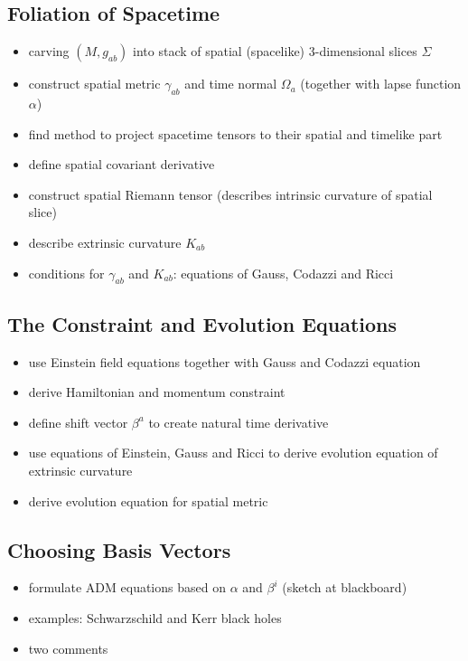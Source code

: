 \documentclass[twocolumn]{article}
\begin{document}
    \subsection{Foliation of Spacetime} %
    \label{sub:foliation_of_spacetime}
      \begin{itemize}
        \item carving $(M,g_{ab})$ into stack of spatial (spacelike) $3$-dimensional slices $Σ$
        \item construct spatial metric $γ_{ab}$ and time normal $\Omega_a$ (together with lapse function $α$)
        \item find method to project spacetime tensors to their spatial and timelike part
        \item define spatial covariant derivative
        \item construct spatial Riemann tensor (describes intrinsic curvature of spatial slice)
        \item describe extrinsic curvature $K_{ab}$
        \item conditions for $γ_{ab}$ and $K_{ab}$: equations of Gauss, Codazzi and Ricci
      \end{itemize}

    \subsection{The Constraint and Evolution Equations} %
    \label{sub:the_constraint_and_evolution_equations}
      \begin{itemize}
        \item use Einstein field equations together with Gauss and Codazzi equation
        \item derive Hamiltonian and momentum constraint
        \item define shift vector $β^a$ to create natural time derivative
        \item use equations of Einstein, Gauss and Ricci to derive evolution equation of extrinsic curvature
        \item derive evolution equation for spatial metric
      \end{itemize}

    \subsection{Choosing Basis Vectors} %
    \label{sub:choosing_basis_vectors}
      \begin{itemize}
        \item formulate ADM equations based on $α$ and $β^i$ (sketch at blackboard)
        \item examples: Schwarzschild and Kerr black holes
        \item two comments
      \end{itemize}
\end{document}
